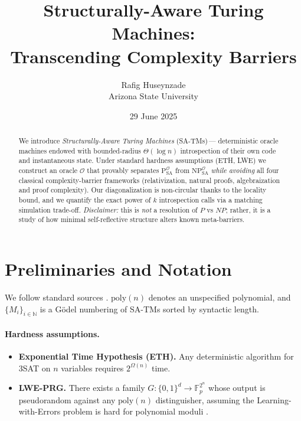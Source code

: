 \documentclass[12pt]{article}
\newcommand{\classP}{\mathrm{P}}
\newcommand{\classNP}{\mathrm{NP}}
\newcommand{\SA}{\mathrm{SA}}
\newcommand{\OO}{\mathcal{O}}
\newcommand{\poly}{\mathrm{poly}}
\newcommand{\F}{\mathbb{F}}
\theoremstyle{definition}
\theoremstyle{plain}
\theoremstyle{remark}
\begin{document}
\title{Structurally-Aware Turing Machines:\\Transcending Complexity Barriers}
\author{Rafig Huseynzade\\[1ex]\small Arizona State University}
\date{29 June 2025}
\maketitle

\begin{abstract}
We introduce \emph{Structurally-Aware Turing Machines} (SA-TMs)\,—
deterministic oracle machines endowed with
bounded-radius \(\Theta(\log n)\) introspection of their own code
and instantaneous state.
Under standard hardness assumptions (ETH, LWE) we construct an oracle
\(\OO\) that provably separates
\(\classP^{\OO}_{\SA}\) from \(\classNP^{\OO}_{\SA}\)
\emph{while avoiding} all four classical complexity-barrier
frameworks (relativization, natural proofs, algebraization
and proof complexity).
Our diagonalization is non-circular thanks to the locality bound,
and we quantify the exact power of \(k\) introspection calls via
a matching simulation trade-off.
\emph{Disclaimer:} this is \emph{not} a resolution of
\(P\) vs \(NP\); rather, it is a study of how minimal self-reflective
structure alters known meta-barriers.
\end{abstract}

\tableofcontents
\newpage

\section{Preliminaries and Notation}

We follow standard sources \cite{AB09,Sip12}.
\(\poly(n)\) denotes an unspecified polynomial,
and \(\{M_i\}_{i\in\mathbb N}\) is a Gödel numbering of SA-TMs
sorted by syntactic length.

\paragraph{Hardness assumptions.}
\vspace{-0.4em}
\begin{itemize}
  \item \textbf{Exponential Time Hypothesis (ETH).}
        Any deterministic algorithm for 3SAT on \(n\) variables
        requires \(2^{\Omega(n)}\) time.
  \item \textbf{LWE-PRG.}\label{sec:lwe-ass}         %
        There exists a family
        \(G\colon\{0,1\}^d\to\F_p^{2^n}\)
        whose output is pseudorandom against any \(\poly(n)\)
        distinguisher, assuming the Learning-with-Errors problem is hard
        for polynomial moduli \cite{Albrecht17}.
\end{itemize}
\end{document}
